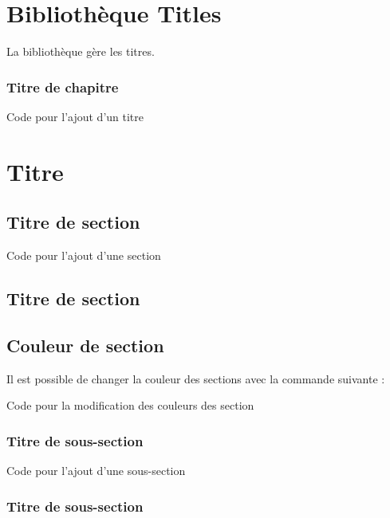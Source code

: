 {\chapter{Bibliothèque Titles}

La bibliothèque  gère les titres.\\

\subsection{Titre de chapitre}
\begin{Latex}{Code pour l'ajout d'un titre}
\chapter{Titre}
\end{Latex}

\section{Titre de section}
\begin{Latex}{Code pour l'ajout d'une section}
\section{Titre de section}
\end{Latex}

\section{Couleur de section}

Il est possible de changer la couleur des sections avec la commande suivante : \\

\begin{Latex}{Code pour la modification des couleurs des section}
\end{Latex}


\subsection{Titre de sous-section}

\begin{Latex}{Code pour l'ajout d'une sous-section}
\subsection{Titre de sous-section}
\end{Latex}

}
